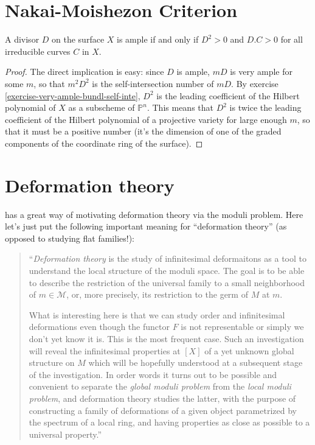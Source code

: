 \section{Nakai-Moishezon Criterion}
\label{section-Nakai-Moishezon-criterion}

\begin{theorem}
\label{theorem-Nakai-Moishezon-criterion}
\begin{reference}
\cite[V, Theorem 1.10]{hart}
\end{reference}
A divisor $D$ on the surface $X$ is ample if
and only if $D^2>0$ and $D.C>0$ for
all irreducible curves $C$ in $X$.
\end{theorem}

\begin{proof}
The direct implication is easy: since $D$ is
ample,  $mD$ is very ample for some
$m$, so that $m^2D^2$ is the
self-intersection number of $mD$. By exercise
\ref{exercise-very-ample-bundl-self-inte},
 $D^2$ is the leading coefficient of the
 Hilbert polynomial of $X$ as a
subscheme of $\mathbb{P}^n$. This means that
$D^2$ is twice the leading
coefficient of the Hilbert polynomial of a
projective variety for large enough
$m$, so that it must be a positive number
(it's the dimension of one of the
graded components of the coordinate ring of
the surface).
\end{proof}

\section{Deformation theory}
\label{section-deformation-theory}

\noindent
\cite{Sernesi-Overview} has a great way of
motivating deformation
theory via the moduli problem.
Here let's just put the following important
meaning for
``deformation theory'' (as opposed to
studying flat families!):

\begin{quote}
``{\it Deformation theory} is the study of
infinitesimal deformaitons
as a tool to understand the local structure
of the moduli space.
The goal is to be able to describe the
restriction
of the universal family to a small
neighborhood of $m \in \mathcal{M}$,
or, more precisely, its restriction to the
germ of $M$ at $m$.

What is interesting here is that we can study
order and infinitesimal
deformations even though the functor $F$ is
not representable or simply we don’t
yet know it is. This is the most frequent
case. Such an investigation will
reveal the infinitesimal properties at $[X]$
of a yet unknown global structure
on $M$ which will be hopefully understood at
a subsequent stage of the
investigation.  In order words it turns out
to be possible and convenient to
separate the {\it global moduli problem} from
the {\it local moduli problem},
and deformation theory studies the latter,
with the purpose of constructing a
family of deformations of a given object
parametrized by the spectrum of a local
ring, and having properties as close as
possible to a universal property.''
\end{quote}




